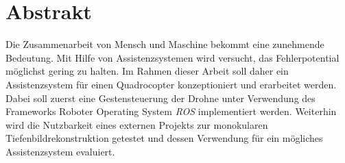 \chapter*{Abstrakt} 
Die Zusammenarbeit von Mensch und Maschine bekommt eine zunehmende Bedeutung. Mit Hilfe von Assistenzsystemen wird versucht, das Fehlerpotential möglichst gering zu halten. \newline
Im Rahmen dieser Arbeit soll daher ein Assistenzsystem für einen Quadrocopter konzeptioniert und erarbeitet werden. Dabei soll zuerst eine Gestensteuerung der Drohne unter Verwendung des Frameworks Roboter Operating System \emph{ROS} implementiert werden. Weiterhin wird die Nutzbarkeit eines externen Projekts zur monokularen Tiefenbildrekonstruktion getestet und dessen Verwendung für ein mögliches Assistenzsystem evaluiert. 

